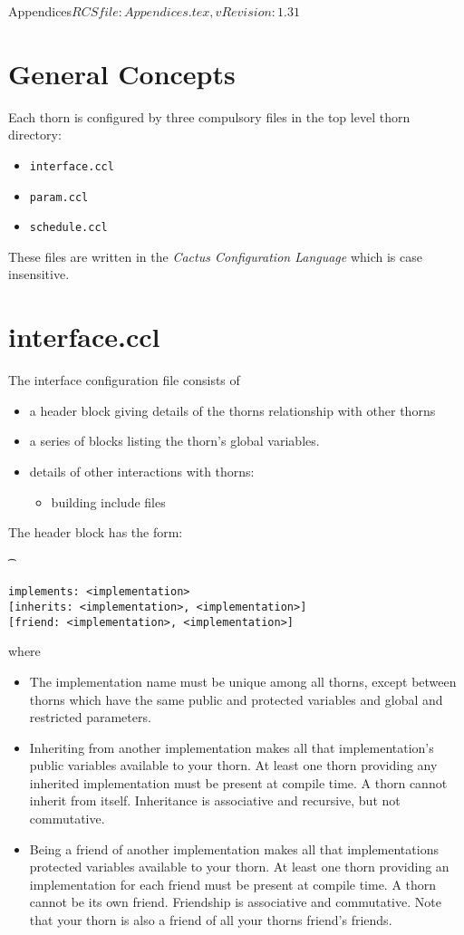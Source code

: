 \begin{cactuspart}{6}{Appendices}{$RCSfile: Appendices.tex,v $}{$Revision: 1.31 $}
\section{General Concepts}
\label{sec:geco}

Each thorn is configured by three compulsory files in the top level thorn
directory:
\begin{itemize}
\item{} {\tt interface.ccl}
\item{} {\tt param.ccl}
\item{} {\tt schedule.ccl}
\end{itemize}
These files are written in the {\it Cactus Configuration Language} which is
case insensitive.

\section{interface.ccl}
\label{sec:in}

The interface configuration file consists of
\begin{itemize}
\item a header block giving details
of the thorns relationship with other thorns
\item a series of blocks
listing the thorn's global variables.
\item details of other interactions with thorns:
\begin{itemize}
\item building include files
\end{itemize}
\end{itemize}

The header block has the form:
{\t
\begin{verbatim}
implements: <implementation>
[inherits: <implementation>, <implementation>]
[friend: <implementation>, <implementation>]
\end{verbatim}
}
where
\begin{itemize}
\item{} The implementation name must be unique among all thorns, except
        between thorns which have the same public and protected variables and
        global and restricted parameters.
\item{} Inheriting from another implementation makes all that implementation's
        public variables available to your thorn. At least one thorn
        providing any inherited implementation must be present at compile time.
        A thorn cannot inherit from itself. Inheritance is associative and
        recursive, but not commutative.
\item{} Being a friend of another implementation makes all that
        implementations
        protected variables available to your thorn. At least one thorn
        providing an implementation for each friend must be present at
        compile time. A thorn cannot be its own friend. Friendship is
        associative and commutative. Note that your thorn is also a friend
        of all your thorns friend's friends.
\end{itemize}


\end{cactuspart}

